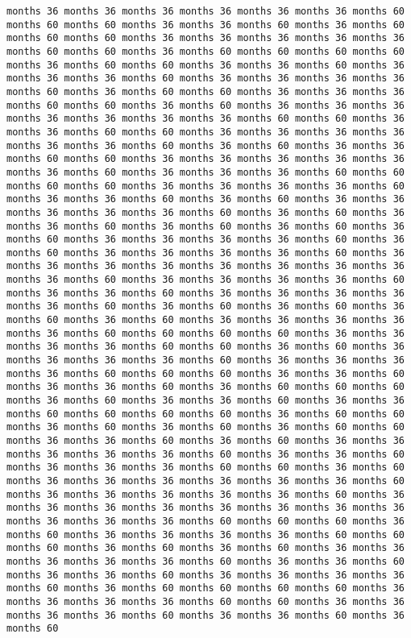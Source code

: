 \documentclass[11pt]{article}
\begin{document}
\begin{Verbatim}[commandchars=\\\{\}, frame=single, framerule=2mm, rulecolor=\color{outerrorbackground}]
months 36 months 36 months 36 months 36 months 36 months 36 months 60 months 60 months 60 months 36 months 36 months 60 months 36 months 60 months 60 months 60 months 36 months 36 months 36 months 36 months 36 months 60 months 60 months 36 months 60 months 60 months 60 months 60 months 36 months 60 months 60 months 36 months 36 months 60 months 36 months 36 months 36 months 60 months 36 months 36 months 36 months 36 months 60 months 36 months 60 months 60 months 36 months 36 months 36 months 60 months 60 months 36 months 60 months 36 months 36 months 36 months 36 months 36 months 36 months 36 months 60 months 60 months 36 months 36 months 60 months 60 months 36 months 36 months 36 months 36 months 36 months 36 months 60 months 36 months 60 months 36 months 36 months 60 months 60 months 36 months 36 months 36 months 36 months 36 months 36 months 60 months 36 months 36 months 36 months 60 months 60 months 60 months 60 months 36 months 36 months 36 months 36 months 60 months 36 months 36 months 60 months 36 months 60 months 36 months 36 months 36 months 36 months 36 months 60 months 36 months 60 months 36 months 36 months 60 months 36 months 60 months 36 months 60 months 36 months 60 months 36 months 36 months 36 months 36 months 60 months 36 months 60 months 36 months 36 months 36 months 36 months 60 months 36 months 36 months 36 months 36 months 36 months 36 months 36 months 36 months 36 months 60 months 36 months 36 months 36 months 36 months 60 months 36 months 36 months 60 months 36 months 36 months 36 months 36 months 36 months 60 months 36 months 60 months 36 months 60 months 36 months 60 months 36 months 60 months 36 months 36 months 36 months 36 months 36 months 60 months 60 months 60 months 60 months 36 months 36 months 36 months 36 months 60 months 60 months 36 months 60 months 36 months 36 months 36 months 36 months 60 months 36 months 36 months 36 months 36 months 60 months 60 months 60 months 36 months 36 months 60 months 36 months 36 months 60 months 36 months 60 months 60 months 60 months 36 months 60 months 36 months 36 months 60 months 36 months 36 months 60 months 60 months 60 months 60 months 36 months 60 months 60 months 36 months 60 months 36 months 60 months 36 months 60 months 60 months 36 months 36 months 60 months 36 months 60 months 36 months 36 months 36 months 36 months 36 months 60 months 36 months 36 months 60 months 36 months 36 months 36 months 60 months 60 months 36 months 60 months 36 months 36 months 36 months 36 months 36 months 36 months 60 months 36 months 36 months 36 months 36 months 36 months 60 months 36 months 36 months 36 months 36 months 36 months 36 months 36 months 36 months 36 months 36 months 36 months 60 months 60 months 60 months 36 months 60 months 36 months 36 months 36 months 36 months 60 months 60 months 60 months 36 months 60 months 36 months 60 months 36 months 36 months 36 months 36 months 36 months 60 months 36 months 36 months 60 months 36 months 36 months 60 months 36 months 36 months 36 months 36 months 60 months 36 months 60 months 60 months 60 months 60 months 36 months 36 months 36 months 36 months 60 months 60 months 36 months 36 months 36 months 36 months 60 months 36 months 36 months 60 months 36 months 60 
\end{Verbatim}
\end{document}
